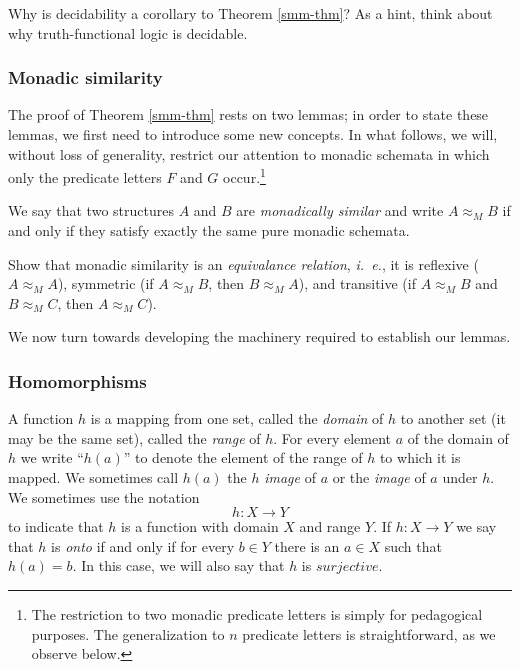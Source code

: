 \begin{aside}
    Why is decidability a corollary to Theorem \ref{smm-thm}? As a hint, think about why truth-functional logic is decidable.
\end{aside}

\subsubsection*{Monadic similarity}
The proof of Theorem \ref{smm-thm} rests on two lemmas; in order to state these lemmas, we first need to introduce some new concepts. In what follows, we will, without loss of generality, restrict our attention to monadic schemata in which only the predicate letters $F$ and $G$ occur.\footnote{The restriction to two monadic predicate letters is simply for pedagogical purposes. The generalization to $n$ predicate letters is straightforward, as we observe below.}%

\begin{definition}
    We say that two structures $A$ and $B$ are {\em monadically similar} and write $A \approx_M B$ if and
only if they satisfy exactly the same pure monadic schemata.
\end{definition}

\begin{aside}
    Show that monadic similarity is an \emph{equivalance relation}, \emph{i.~e.}, it is reflexive ($A \approx_M A$), symmetric (if $A \approx_M B$, then $B \approx_M A$), and transitive (if $A \approx_M B$ and $B \approx_M C$, then $A \approx_M C$). 
\end{aside}

We now turn towards developing the machinery required to establish our lemmas.%


\subsubsection*{Homomorphisms}

A function $h$ is a mapping from one set, called the {\em domain} of $h$ to
another set (it may be the same set), called the {\em range} of $h.$ For every
element $a$ of the domain of $h$ we write ``$h(a)$'' to denote the element of
the 
range of $h$ to which it is mapped. We sometimes call $h(a)$ the $h$ {\em
image} of 
$a$ or the {\em image} of $a$ under $h.$ We sometimes use the notation
$$h: X \longrightarrow Y$$
to indicate that $h$ is a function with domain $X$ and range $Y.$
If $h: X \longrightarrow Y$ we say that $h$ is {\em onto} if and only if for
every 
$b\in Y$ there is an $a \in X$ such that $h(a)=b.$
In this case, we will also say that $h$ is $surjective.$

